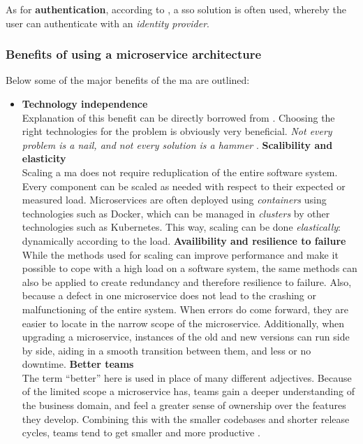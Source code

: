 As for \textbf{authentication}, according to \textcite{Newman_2015}, a \gls{sso}
solution is often used, whereby the user can authenticate with an
\textit{identity provider}.


\subsubsection{Benefits of using a microservice architecture}

Below some of the major benefits of the \gls{ma} are outlined:

\begin{itemize}
    \item \textbf{Technology independence}\\
    Explanation of this benefit can be directly borrowed from
    . Choosing the right technologies for the problem
    is obviously very beneficial. \textit{Not every problem is a nail, and not
    every solution is a hammer} \autocite{Fowler_Microservices_2014}. 
    \spacedItem \textbf{Scalibility and elasticity}\\
    Scaling a \gls{ma} does not require reduplication of the entire software
    system. Every component can be scaled as needed with respect to their
    expected or measured load. Microservices are often deployed using
    \textit{containers} using technologies such as
    Docker, which can be managed in
    \textit{clusters} by other technologies such as
    Kubernetes. This way, scaling can be
    done \textit{elastically}: dynamically according to the load.
    \autocite{Dragoni_etal_2018}
    \spacedItem \textbf{Availibility and resilience to failure}\\
    While the methods used for scaling can improve performance and make it
    possible to cope with a high load on a software system, the same methods can
    also be applied to create redundancy and therefore resilience to failure.
    Also, because a defect in one \gls{microservice} does not lead to the
    crashing or malfunctioning of the entire system. When errors do come
    forward, they are easier to locate in the narrow scope of the
    \gls{microservice}. Additionally, when upgrading a microservice,
    instances of the old and new versions can run side by side, aiding in a
    smooth transition between them, and less or no downtime.
    \autocite{Dragoni_etal_2017}
    \spacedItem \textbf{Better teams}\\
    The term ``better'' here is used in place of many different adjectives.
    Because of the limited scope a \gls{microservice} has, teams gain a deeper
    understanding of the business domain, and feel a greater sense of ownership
    over the features they develop. Combining this with the smaller codebases
    and shorter release cycles, teams tend to get smaller and more productive
    \autocite{Newman_2015}.
\end{itemize}

